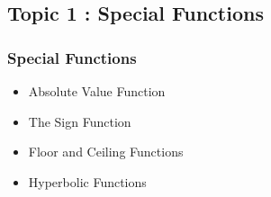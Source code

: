 \documentclass{beamer}
\begin{document}
\subsection*{Topic 1 : Special Functions}
\begin{frame}
	\frametitle{Special Functions}
	\begin{itemize}
		\item Absolute Value Function
		\item The Sign Function
		\item Floor and Ceiling Functions
		\item Hyperbolic Functions
	\end{itemize}	
\end{frame}
\end{document}

